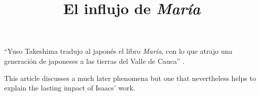 \documentclass[12pt]{article}
\title{El influjo de \textit{María}}
\makeatletter
\newcommand\iraggedright{%
	\let\\\@centercr\@rightskip\@flushglue \rightskip\@rightskip
	\leftskip\z@skip}
\makeatother
\begin{document}
	\makeheader
	\iraggedright

\enquote{Yuso Takeshima tradujo al japonés el libro \textit{María}, con lo que atrajo una generación de japoneses a las tierras del Valle de Cauca} \cite[37]{Patiño1992}.

This article discusses a much later phenomena but one that nevertheless helps to explain the lasting impact of Isaacs' work.
\end{document}
